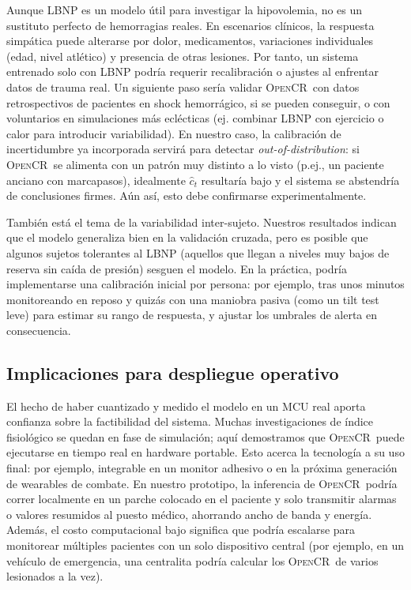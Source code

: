 \documentclass[10pt,a4paper,twocolumn]{article}
\newcommand{\OpenCR}{\textsc{OpenCR}}
\begin{document}
Aunque LBNP es un modelo \'util para investigar la hipovolemia, no es un sustituto perfecto de hemorragias reales. En escenarios cl\'inicos, la respuesta simp\'atica puede alterarse por dolor, medicamentos, variaciones individuales (edad, nivel atl\'etico) y presencia de otras lesiones. Por tanto, un sistema entrenado solo con LBNP podr\'ia requerir recalibraci\'on o ajustes al enfrentar datos de trauma real. Un siguiente paso ser\'ia validar \OpenCR\ con datos retrospectivos de pacientes en shock hemorr\'agico, si se pueden conseguir, o con voluntarios en simulaciones m\'as ecl\'ecticas (ej. combinar LBNP con ejercicio o calor para introducir variabilidad). En nuestro caso, la calibraci\'on de incertidumbre ya incorporada servir\'a para detectar \emph{out-of-distribution}: si \OpenCR\ se alimenta con un patr\'on muy distinto a lo visto (p.ej., un paciente anciano con marcapasos), idealmente $\hat c_t$ resultar\'ia bajo y el sistema se abstendr\'ia de conclusiones firmes. A\'un as\'i, esto debe confirmarse experimentalmente.

Tambi\'en est\'a el tema de la variabilidad inter-sujeto. Nuestros resultados indican que el modelo generaliza bien en la validaci\'on cruzada, pero es posible que algunos sujetos tolerantes al LBNP (aquellos que llegan a niveles muy bajos de reserva sin ca\'ida de presi\'on) sesguen el modelo. En la pr\'actica, podr\'ia implementarse una calibraci\'on inicial por persona: por ejemplo, tras unos minutos monitoreando en reposo y quiz\'as con una maniobra pasiva (como un tilt test leve) para estimar su rango de respuesta, y ajustar los umbrales de alerta en consecuencia.

\subsection{Implicaciones para despliegue operativo}

El hecho de haber cuantizado y medido el modelo en un MCU real aporta confianza sobre la factibilidad del sistema. Muchas investigaciones de \'indice fisiol\'ogico se quedan en fase de simulaci\'on; aqu\'i demostramos que \OpenCR\ puede ejecutarse en tiempo real en hardware portable. Esto acerca la tecnolog\'ia a su uso final: por ejemplo, integrable en un monitor adhesivo o en la pr\'oxima generaci\'on de wearables de combate. En nuestro prototipo, la inferencia de \OpenCR\ podr\'ia correr localmente en un parche colocado en el paciente y solo transmitir alarmas o valores resumidos al puesto m\'edico, ahorrando ancho de banda y energ\'ia. Adem\'as, el costo computacional bajo significa que podr\'ia escalarse para monitorear m\'ultiples pacientes con un solo dispositivo central (por ejemplo, en un veh\'iculo de emergencia, una centralita podr\'ia calcular los \OpenCR\ de varios lesionados a la vez). 
\end{document}
